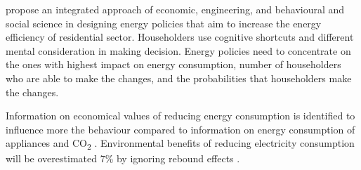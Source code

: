 \documentclass[preprint,12pt,3p]{elsarticle}
\begin{document}
\citeauthor{dietz2013} \citeyearpar{dietz2013} propose an integrated approach of economic, engineering, and behavioural and social science in designing energy policies that aim to increase the energy efficiency of residential sector. Householders use cognitive shortcuts and different mental consideration in making decision. Energy policies need to concentrate on the ones with highest impact on energy consumption, number of householders who are able to make the changes, and the probabilities that householders make the changes. 

Information on economical values of reducing energy consumption is identified to influence more the behaviour compared to information on energy consumption of appliances and CO\textsubscript{2} \citep{newell2014}. Environmental benefits of reducing electricity consumption will be overestimated 7\% by ignoring rebound effects \citep{murray2013}.
\end{document}
